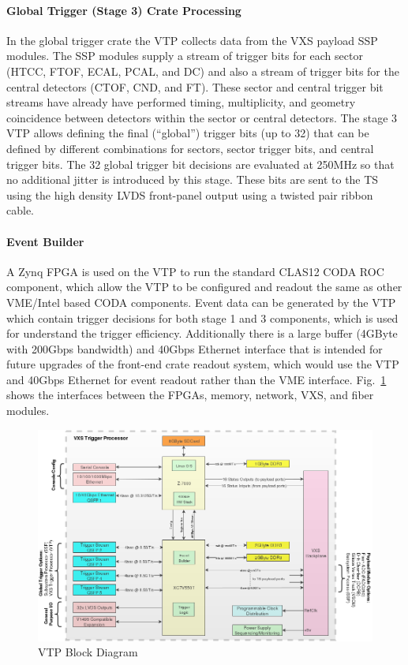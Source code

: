\paragraph{Global Trigger (Stage 3) Crate Processing}
In the global trigger crate the VTP collects data from the VXS payload SSP modules. The SSP modules supply a stream of trigger bits for each sector (HTCC, FTOF, ECAL, PCAL, and DC) and also a stream of trigger bits for the central detectors (CTOF, CND, and FT). These sector and central trigger bit streams have already have performed timing, multiplicity, and geometry coincidence between detectors within the sector or central detectors. The stage 3 VTP allows defining the final (``global'') trigger bits (up to 32) that can be defined by different combinations for sectors, sector trigger bits, and central trigger bits. The 32 global trigger bit decisions are evaluated at 250MHz so that no additional jitter is introduced by this stage. These bits are sent to the TS using the high density LVDS front-panel output using a twisted pair ribbon cable.

\paragraph{Event Builder}
A Zynq FPGA is used on the VTP to run the standard CLAS12 CODA ROC component, which allow the VTP to be configured and readout the same as other VME/Intel based CODA components. Event data can be generated by the VTP which contain trigger decisions for both stage 1 and 3 components, which is used for understand the trigger efficiency. Additionally there is a large buffer (4GByte with 200Gbps bandwidth) and 40Gbps Ethernet interface that is intended for future upgrades of the front-end crate readout system, which would use the VTP and 40Gbps Ethernet for event readout rather than the VME interface. Fig.~\ref{fig:vtp_block_daq} shows the interfaces between the FPGAs, memory, network, VXS, and fiber modules.

\begin{figure}[hbt]
	\centering
	\includegraphics[width=1.0\columnwidth,keepaspectratio]{img/vtp_block_daq.png}
	\caption{VTP Block Diagram}
	\label{fig:vtp_block_daq}
\end{figure}
